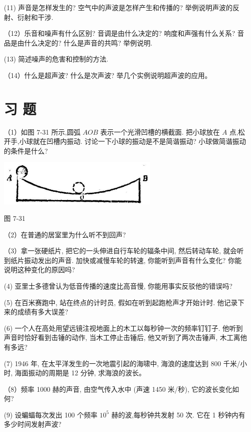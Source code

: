 \documentclass[10pt]{article}
\begin{document}
(11) 声音是怎样发生的? 空气中的声波是怎样产生和传播的? 举例说明声波的反射、衍射和干涉.

（12）乐音和噪声有什么区别? 音调是由什么决定的? 响度和声强有什么关系? 音品是由什么决定的? 什么是声音的共鸣? 举例说明.

(13) 简述噪声的危害和控制的方法.

（14）什么是超声波? 什么是次声波? 举几个实例说明超声波的应用。

\section*{习 题}

（1）如图 7-31 所示,圆弧 \({AOB}\) 表示一个光滑凹槽的横截面. 把小球放在 \(A\) 点,松开手,小球就在凹槽内振动. 讨论一下小球的振动是不是简谐振动? 小球做简谐振动的条件是什么?

\begin{center}
\includegraphics[max width=0.6\textwidth]{images/01912d55-147c-70aa-b0e0-1782a122f948_230_813386.jpg}
\end{center}

图 7-31

（2）在普通的居室里为什么听不到回声?

（3）拿一张硬纸片, 把它的一头伸进自行车轮的辐条中间, 然后转动车轮, 就会听到纸片振动发出的声音. 加快或减慢车轮的转速, 你能听到声音有什么变化? 你能说明这种变化的原因吗?

(4) 亚里士多德曾认为低音传播的速度比高音慢, 你能用事实反驳他的错误吗?

(5) 在百米赛跑中, 站在终点的计时员, 假如在听到起跑枪声才开始计时. 他记录下来的成绩有多大误差?

(6) 一个人在高处用望远镜注视地面上的木工以每秒钟一次的频率钉钉子. 他听到声音时恰好看到击锤的动作, 当木工停止击锤后, 他又听到了两次击锤声, 木工离他有多远?

(7) 1946 年, 在太平洋发生的一次地震引起的海啸中, 海浪的速度达到 800 千米/小时, 海面振动的周期是 12 分钟, 求海浪的波长。

（8）频率 1000 赫的声音, 由空气传入水中 (声速 1450 米/秒), 它的波长变化如何?

(9) 设蝙蝠每次发出 100 个频率 \({10}^{5}\) 赫的波,每秒钟共发射 50 次. 它在 1 秒钟内有多少时间发射声波?
\end{document}
